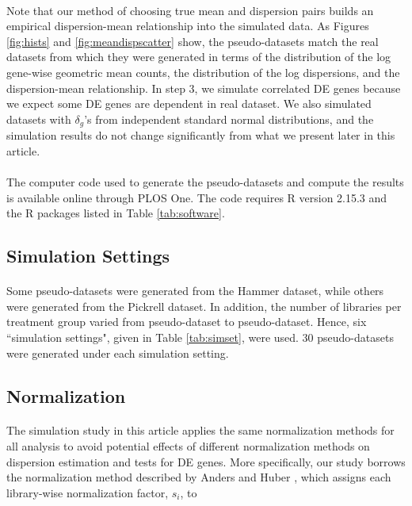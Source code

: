 \documentclass[10pt]{article}
\begin{document}
\paragraph{} \indent Note that our method of choosing true mean and dispersion pairs builds an empirical dispersion-mean relationship into the simulated data. As Figures \ref{fig:hists} and \ref{fig:meandispscatter} show, the pseudo-datasets match the real datasets from which they were generated in terms of the distribution of the log gene-wise geometric mean counts, the distribution of the log dispersions, and the dispersion-mean relationship. In step 3, we simulate correlated DE genes because we expect some DE genes are dependent in real dataset. We also simulated datasets with $\delta_g$'s from independent standard normal distributions, and the simulation results do not change significantly from what we present later in this article.

\paragraph{} \indent The computer code used to generate the pseudo-datasets and compute the results is available online through PLOS One. The code requires R version 2.15.3 and the R packages listed in Table \ref{tab:software}.

\subsection*{Simulation Settings}

\paragraph{} \indent Some pseudo-datasets were generated from the Hammer dataset, while others were generated from the Pickrell dataset. In addition, the number of libraries per treatment group varied from pseudo-dataset to pseudo-dataset. Hence, six ``simulation settings", given in Table \ref{tab:simset}, were used. 30 pseudo-datasets were generated under each simulation setting.

\subsection*{Normalization}

\paragraph{} \indent
The simulation study in this article applies the same normalization methods for all analysis to avoid potential effects of different normalization methods on dispersion estimation and tests for DE genes. More specifically, our study borrows the normalization method described by Anders and Huber \cite{deseq}, which assigns each library-wise normalization factor, $s_i$, to
\end{document}

